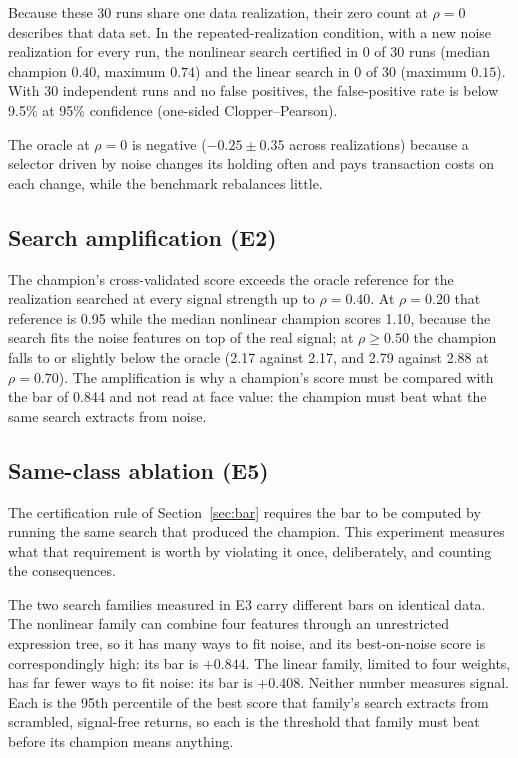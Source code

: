 \documentclass[11pt]{article}
\begin{document}
Because these 30 runs share one data realization, their zero count at $\rho=0$ describes that data set.
In the repeated-realization condition, with a new noise realization for every run, the nonlinear search
certified in 0 of 30 runs (median champion $0.40$, maximum $0.74$) and the linear search in 0 of 30
(maximum $0.15$). With 30 independent runs and no false positives, the false-positive rate is below 9.5\%
at 95\% confidence (one-sided Clopper--Pearson).

The oracle at $\rho=0$ is negative ($-0.25\pm0.35$ across realizations) because a selector driven by noise
changes its holding often and pays transaction costs on each change, while the benchmark rebalances
little.

\subsection{Search amplification (E2)}
\label{sec:e2}

The champion's cross-validated score exceeds the oracle reference for the realization searched at
every signal strength up to $\rho=0.40$. At $\rho=0.20$ that reference is 0.95 while the median nonlinear
champion scores 1.10, because the search fits the noise features on top of the real signal; at
$\rho\ge 0.50$ the champion falls to or slightly below the oracle (2.17 against 2.17, and 2.79 against
2.88 at $\rho=0.70$). The amplification is why a
champion's score must be compared with the bar of 0.844 and not read at face value: the champion must beat
what the same search extracts from noise.

\subsection{Same-class ablation (E5)}
\label{sec:ablation}

The certification rule of Section~\ref{sec:bar} requires the bar to be computed by running the same
search that produced the champion. This experiment measures what that requirement is worth by violating
it once, deliberately, and counting the consequences.

The two search families measured in E3 carry different bars on identical data. The nonlinear family can
combine four features through an unrestricted expression tree, so it has many ways to fit noise, and its
best-on-noise score is correspondingly high: its bar is $+0.844$. The linear family, limited to four
weights, has far fewer ways to fit noise: its bar is $+0.408$. Neither number measures signal. Each is
the 95th percentile of the best score that family's search extracts from scrambled, signal-free returns,
so each is the threshold that family must beat before its champion means anything.
\end{document}
